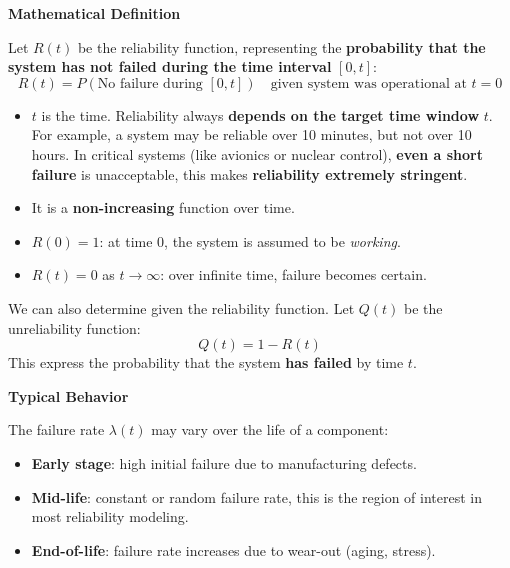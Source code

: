 \highspace
\begin{flushleft}
    \textcolor{Green3}{ \textbf{Mathematical Definition}}
\end{flushleft}
Let $R(t)$ be the reliability function, representing the \textbf{probability that the system has not failed during the time interval} $\left[0, t\right]$:
\begin{equation}
    R(t) = P\left(\text{No failure during } \left[0, t\right]\right) \quad \text{given system was operational at } t = 0    
\end{equation}
\begin{itemize}
    \item $t$ is the time. Reliability always \textbf{depends on the target time window} $t$. For example, a system may be reliable over 10 minutes, but not over 10 hours. In critical systems (like avionics or nuclear control), \textbf{even a short failure} is unacceptable, this makes \textbf{reliability extremely stringent}.
    \item It is a \textbf{non-increasing} function over time.
    \item $R(0) = 1$: at time 0, the system is assumed to be \emph{working}.
    \item $R(t) = 0$ as $t \rightarrow \infty$: over infinite time, failure becomes certain.
\end{itemize}
We can also determine  given the reliability function. Let $Q\left(t\right)$ be the unreliability function:
\begin{equation}
    Q\left(t\right) = 1 - R\left(t\right)
\end{equation}
This express the probability that the system \textbf{has failed} by time $t$.

\highspace
\begin{flushleft}
    \textcolor{Green3}{ \textbf{Typical Behavior}}
\end{flushleft}
The failure rate $\lambda\left(t\right)$ may vary over the life of a component:
\begin{itemize}
    \item \textbf{Early stage}: high initial failure due to manufacturing defects.
    \item \textbf{Mid-life}: constant or random failure rate, this is the region of interest in most reliability modeling.
    \item \textbf{End-of-life}: failure rate increases due to wear-out (aging, stress).
\end{itemize}

